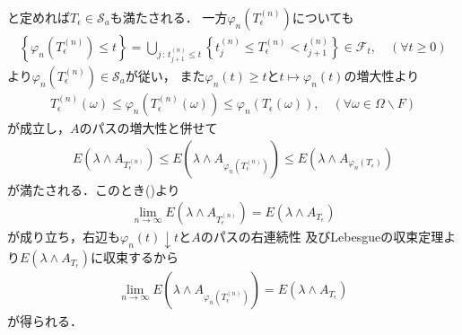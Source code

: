 \begin{prf}
\begin{description}
				と定めれば$T_\epsilon \in \mathscr{S}_a$も満たされる．
				一方$\varphi_n\left(T^{(n)}_\epsilon\right)$についても
				\begin{align}
					\left\{\varphi_n\left(T^{(n)}_\epsilon\right) \leq t\right\}
					= \bigcup_{j\, :\, t^{(n)}_{j+1} \leq t} \left\{t^{(n)}_j \leq T^{(n)}_\epsilon < t^{(n)}_{j+1}\right\}
					\in \mathscr{F}_t,
					\quad (\forall t \geq 0)
				\end{align}
				より$\varphi_n\left(T^{(n)}_\epsilon\right) \in \mathscr{S}_a$が従い，
				また$\varphi_n(t) \geq t$と$t \longmapsto \varphi_n(t)$の増大性より
				\begin{align}
					T^{(n)}_\epsilon(\omega)
					\leq \varphi_n\left(T^{(n)}_\epsilon(\omega)\right)
					\leq \varphi_n\left(T_\epsilon(\omega)\right),
					\quad (\forall \omega \in \Omega \backslash F)
				\end{align}
				が成立し，$A$のパスの増大性と併せて
				\begin{align}
					E \left( \lambda \wedge A_{T^{(n)}_\epsilon} \right)
					\leq E \left( \lambda \wedge A_{\varphi_n\left(T^{(n)}_\epsilon\right)} \right)
					\leq E \left( \lambda \wedge A_{\varphi_n\left(T_\epsilon\right)} \right)
				\end{align}
				が満たされる．このとき()より
				\begin{align}
					\lim_{n \to \infty} E \left( \lambda \wedge A_{T^{(n)}_\epsilon} \right)
					= E \left( \lambda \wedge A_{T_\epsilon} \right)
				\end{align}
				が成り立ち，右辺も$\varphi_n(t) \downarrow t$と$A$のパスの右連続性
				及びLebesgueの収束定理より$E \left( \lambda \wedge A_{T_\epsilon} \right)$に収束するから
				\begin{align}
					\lim_{n \to \infty} E \left( \lambda \wedge A_{\varphi_n\left(T^{(n)}_\epsilon\right)} \right) 
					= E \left( \lambda \wedge A_{T_\epsilon} \right)
				\end{align}
				が得られる．
			

\end{description}
\end{prf}
